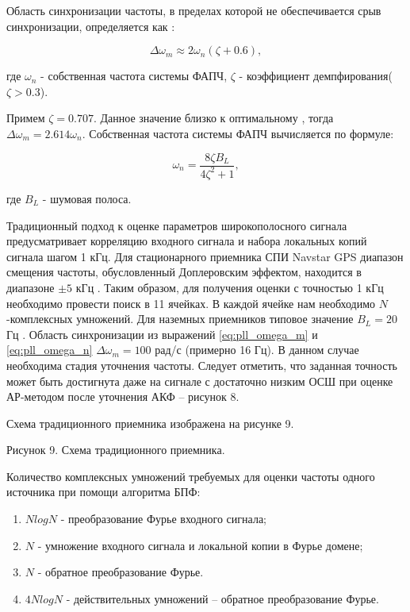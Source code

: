 Область синхронизации частоты, в пределах которой не обеспечивается срыв синхронизации, определяется как \cite{spilker-book}:
\begin{center}
\begin{equation}
	\label{eq:pll_omega_m}
	\Delta \omega_m \approx 2 \omega_n (\zeta+0.6),
\end{equation}
\end{center}
где ${\omega_n}$ - собственная частота системы ФАПЧ, ${\zeta}$ - коэффициент демпфирования(${\zeta > 0.3}$).

Примем ${\zeta = 0.707}$. Данное значение   близко к оптимальному \cite{tsui, spilker-book}, тогда ${\Delta \omega_m = 2.614 \omega_n}$.
Собственная частота системы ФАПЧ вычисляется по формуле:
\begin{center}
\begin{equation}
	\label{eq:pll_omega_n}
	\omega_n = \frac{8 \zeta B_L}{4 \zeta^2 + 1},
\end{equation}
\end{center}
где ${B_L}$ - шумовая полоса.

Традиционный подход к оценке параметров широкополосного сигнала предусматривает корреляцию входного сигнала и набора локальных копий сигнала шагом 1 кГц.
Для стационарного приемника СПИ Navstar GPS диапазон смещения частоты, обусловленный Доплеровским эффектом, находится в диапазоне ${\pm 5}$ кГц \cite{tsui, shahtarin-book}.
Таким образом, для получения оценки с точностью 1 кГц необходимо провести поиск в 11 ячейках. В каждой ячейке нам необходимо ${N}$-комплексных умножений.
Для наземных приемников типовое значение ${B_L=20}$ Гц \cite{tsui}. Область синхронизации из выражений \ref{eq:pll_omega_m} и \ref{eq:pll_omega_n}
${\Delta \omega_m = 100}$ рад/с (примерно 16 Гц).
В данном случае необходима стадия уточнения частоты. Следует отметить, что заданная точность может быть достигнута даже на сигнале с достаточно
низким ОСШ при оценке АР-методом после уточнения АКФ – рисунок 8.

Схема традиционного приемника изображена на рисунке 9.

Рисунок 9. Схема традиционного приемника.

Количество комплексных умножений требуемых для оценки частоты одного источника при помощи алгоритма БПФ:
\begin{enumerate}
\item ${NlogN}$ - преобразование Фурье входного сигнала;
\item ${N}$ - умножение входного сигнала и локальной копии в Фурье домене;
\item ${N}$ - обратное преобразование Фурье.
\item ${4NlogN}$ - действительных умножений – обратное преобразование Фурье. 
\end{enumerate}

